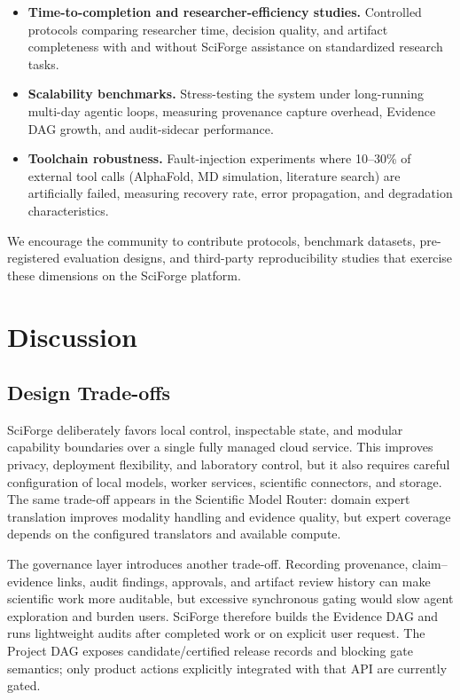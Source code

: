 \documentclass[sn-basic,Numbered,pdflatex]{sn-jnl}
\begin{document}
\begin{itemize}
    \item \textbf{Time-to-completion and researcher-efficiency studies.} Controlled protocols comparing researcher time, decision quality, and artifact completeness with and without SciForge assistance on standardized research tasks.
    
    \item \textbf{Scalability benchmarks.} Stress-testing the system under long-running multi-day agentic loops, measuring provenance capture overhead, Evidence DAG growth, and audit-sidecar performance.
    
    \item \textbf{Toolchain robustness.} Fault-injection experiments where 10--30\% of external tool calls (AlphaFold, MD simulation, literature search) are artificially failed, measuring recovery rate, error propagation, and degradation characteristics.
\end{itemize}

We encourage the community to contribute protocols, benchmark datasets, pre-registered evaluation designs, and third-party reproducibility studies that exercise these dimensions on the SciForge platform.

\section{Discussion}

\subsection{Design Trade-offs}

SciForge deliberately favors local control, inspectable state, and modular capability boundaries over a single fully managed cloud service. This improves privacy, deployment flexibility, and laboratory control, but it also requires careful configuration of local models, worker services, scientific connectors, and storage. The same trade-off appears in the Scientific Model Router: domain expert translation improves modality handling and evidence quality, but expert coverage depends on the configured translators and available compute.

The governance layer introduces another trade-off. Recording provenance, claim--evidence links, audit findings, approvals, and artifact review history can make scientific work more auditable, but excessive synchronous gating would slow agent exploration and burden users. SciForge therefore builds the Evidence DAG and runs lightweight audits after completed work or on explicit user request. The Project DAG exposes candidate/certified release records and blocking gate semantics; only product actions explicitly integrated with that API are currently gated.
\end{document}
